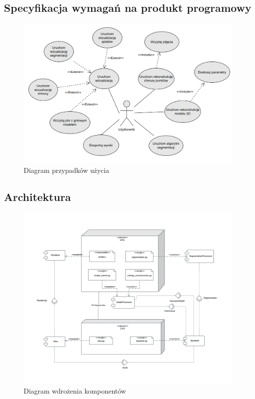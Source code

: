 \subsection{Specyfikacja wymagań na produkt programowy}

\begin{figure}[!htb]
    \includegraphics[width=1.0\linewidth]{img/diagramy/diagram_pu_3.png}
    \caption{Diagram przypadków użycia}\label{fig:use_case_diagram}
  \end{figure}

\subsection{Architektura}

\begin{figure}[!htb]
    \includegraphics[width=1.0\linewidth]{img/diagramy/diagram_wdrozenia_komponentow.png}
    \caption{Diagram wdrożenia komponentów}\label{fig:components_diagram}
\end{figure}


